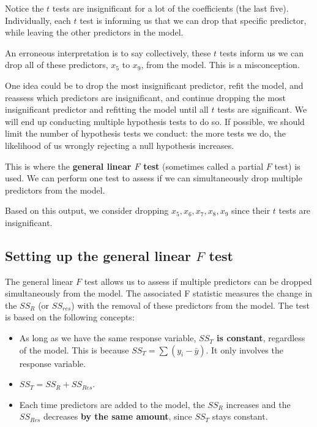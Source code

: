 \documentclass[
]{book}
\providecommand{\tightlist}{%
  \setlength{\itemsep}{0pt}\setlength{\parskip}{0pt}}
\begin{document}
Notice the \(t\) tests are insignificant for a lot of the coefficients (the last five). Individually, each \(t\) test is informing us that we can drop that specific predictor, while leaving the other predictors in the model.

An erroneous interpretation is to say collectively, these \(t\) tests inform us we can drop all of these predictors, \(x_5\) to \(x_9\), from the model. This is a misconception.

One idea could be to drop the most insignificant predictor, refit the model, and reassess which predictors are insignificant, and continue dropping the most insignificant predictor and refitting the model until all \(t\) tests are significant. We will end up conducting multiple hypothesis tests to do so. If possible, we should limit the number of hypothesis tests we conduct: the more tests we do, the likelihood of us wrongly rejecting a null hypothesis increases.

This is where the \textbf{general linear \(F\) test} (sometimes called a partial \(F\) test) is used. We can perform one test to assess if we can simultaneously drop multiple predictors from the model.

Based on this output, we consider dropping \(x_5, x_6, x_7, x_8, x_9\) since their \(t\) tests are insignificant.

\hypertarget{setting-up-the-general-linear-f-test}{%
\subsection{\texorpdfstring{Setting up the general linear \(F\) test}{Setting up the general linear F test}}\label{setting-up-the-general-linear-f-test}}

The general linear \(F\) test allows us to assess if multiple predictors can be dropped simultaneously from the model. The associated F statistic measures the change in the \(SS_R\) (or \(SS_{res}\)) with the removal of these predictors from the model. The test is based on the following concepts:

\begin{itemize}
\tightlist
\item
  As long as we have the same response variable, \textbf{\(SS_T\) is constant}, regardless of the model. This is because \(SS_T = \sum(y_i - \bar{y})\). It only involves the response variable.
\item
  \(SS_T = SS_R + SS_{Res}\).
\item
  Each time predictors are added to the model, the \(SS_R\) increases and the \(SS_{Res}\) decreases \textbf{by the same amount}, since \(SS_T\) stays constant.
\end{itemize}
\end{document}
